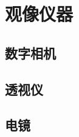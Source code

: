 

\section{观像仪器}\label{24-4}

\subsection{数字相机}\label{24-4-1}

\subsection{透视仪}\label{24-4-2}

\subsection{电镜}\label{24-4-3}